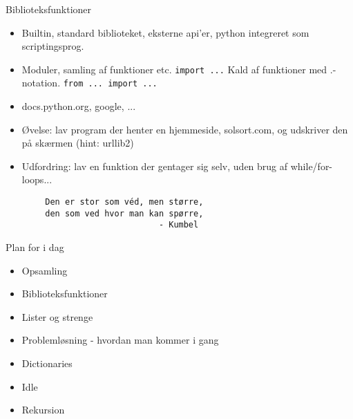\documentclass[a4paper,landscape]{slides}
\begin{document}
\begin{slide}
	\begin{center} {\large 
            Biblioteksfunktioner
	} \end{center}
	\begin{itemize} \addtolength{\itemsep}{-\baselineskip}
                \item Builtin, standard biblioteket, eksterne api'er, python integreret som scriptingsprog.
                \item Moduler, samling af funktioner etc.  \verb|import ...| Kald af funktioner med .-notation.  \verb|from ... import ...|
                \item docs.python.org, google, ...
                \item Øvelse: lav program der henter en hjemmeside, solsort.com, og udskriver den på skærmen (hint: urllib2)
                \item Udfordring: lav en funktion der gentager sig selv, uden brug af while/for-loops...
	\end{itemize}
        \begin{verbatim}
        Den er stor som véd, men større,
        den som ved hvor man kan spørre,
                               - Kumbel
        \end{verbatim}
\end{slide}

\begin{slide}
	\begin{center} {\large 
            Plan for i dag
	} \end{center}
	\begin{itemize} \addtolength{\itemsep}{-\baselineskip}
		\item Opsamling
		\item Biblioteksfunktioner
                \item Lister og strenge
		\item Problemløsning - hvordan man kommer i gang
                \item Dictionaries
		\item Idle
		\item Rekursion
	\end{itemize}
\end{slide}
\end{document}
